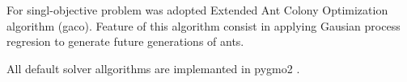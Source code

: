     For singl-objective problem was adopted Extended Ant Colony Optimization algorithm (gaco). Feature of this algorithm consist in applying Gausian process regresion to generate future generations of ants. 

    All default solver allgorithms are implemanted in pygmo2 \cite{francesco_biscani_2019}.























